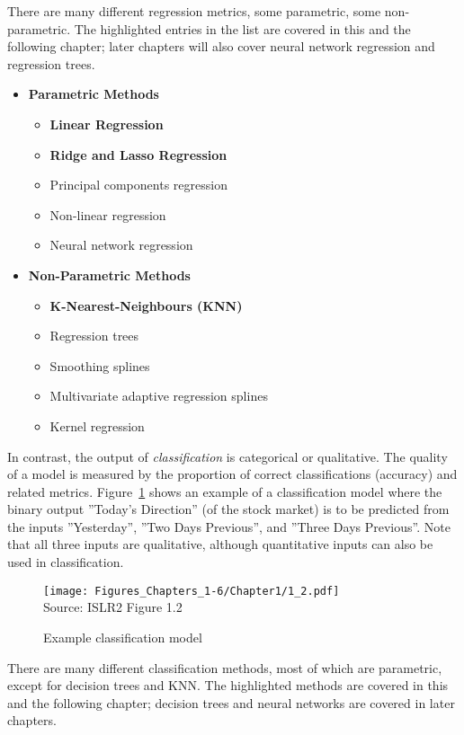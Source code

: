There are many different regression metrics, some parametric, some non-parametric. The highlighted entries in the list are covered in this and the following chapter; later chapters will also cover neural network regression and regression trees. 

\begin{itemize}
\item \textbf{Parametric Methods}
\begin{itemize}
   \item \textbf{Linear Regression}
   \item \textbf{Ridge and Lasso Regression}
   \item Principal components regression
   \item Non-linear regression
   \item Neural network regression
\end{itemize}
\item \textbf{Non-Parametric Methods}
\begin{itemize}
  \item \textbf{K-Nearest-Neighbours (KNN)}
  \item Regression trees
  \item Smoothing splines
  \item Multivariate adaptive regression splines
  \item Kernel regression
\end{itemize}
\end{itemize}

In contrast, the output of \emph{classification} is categorical or qualitative. The quality of a model is measured by the proportion of correct classifications (accuracy) and related metrics. Figure~\ref{fig:classification} shows an example of a classification model where the binary output ''Today's Direction'' (of the stock market) is to be predicted from the inputs ''Yesterday'', ''Two Days Previous'', and ''Three Days Previous''. Note that all three inputs are qualitative, although quantitative inputs can also be used in classification.

\begin{figure}
\centering
\texttt{[image: Figures\_Chapters\_1-6/Chapter1/1\_2.pdf]} \\
\scriptsize Source: ISLR2 Figure 1.2
\caption{Example classification model}
\label{fig:classification}
\end{figure}

There are many different classification methods, most of which are parametric, except for decision trees and KNN. The highlighted methods are covered in this and the following chapter; decision trees and neural networks are covered in later chapters.

